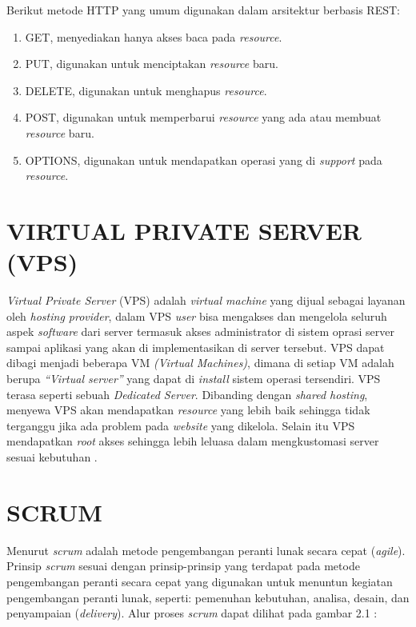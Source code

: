 \par Berikut metode HTTP yang umum digunakan dalam arsitektur berbasis REST:
\begin{enumerate}
	\item GET, menyediakan hanya akses baca pada \textit{resource}.
	\item PUT, digunakan untuk menciptakan \textit{resource} baru.
	\item DELETE, digunakan untuk menghapus \textit{resource}.
	\item POST, digunakan untuk memperbarui \textit{resource} yang ada atau membuat \textit{resource} baru.
	\item OPTIONS, digunakan untuk mendapatkan operasi yang di \textit{support} pada \textit{resource}.
\end{enumerate}

\section{\uppercase{Virtual Private Server (VPS)}}
\textit{Virtual Private Server} (VPS) adalah \textit{virtual machine} yang dijual sebagai layanan oleh \textit{hosting provider}, dalam VPS \textit{user} bisa mengakses dan mengelola seluruh aspek \textit{software} dari server termasuk akses administrator di sistem oprasi server sampai aplikasi yang akan di implementasikan di server tersebut. VPS dapat dibagi menjadi beberapa VM \textit{(Virtual Machines)}, dimana di setiap VM adalah berupa \textit{“Virtual server”} yang dapat di \textit{install} sistem operasi tersendiri. VPS terasa seperti sebuah \textit{Dedicated Server}. Dibanding dengan \textit{shared hosting}, menyewa VPS akan mendapatkan \textit{resource} yang lebih baik sehingga tidak terganggu jika ada problem pada \textit{website} yang dikelola. Selain itu VPS mendapatkan \textit{root} akses sehingga lebih leluasa dalam mengkustomasi server sesuai kebutuhan \citep{hamida2017analisis}.

\section{\uppercase{Scrum}}
Menurut \cite{pressman2010} \textit{scrum} adalah metode pengembangan peranti lunak secara cepat (\textit{agile}). Prinsip \textit{scrum} sesuai dengan prinsip-prinsip yang terdapat pada metode pengembangan peranti secara cepat yang digunakan untuk menuntun kegiatan pengembangan peranti lunak, seperti: pemenuhan kebutuhan, analisa, desain, dan penyampaian (\textit{delivery}). Alur proses \textit{scrum} dapat dilihat pada gambar 2.1 : 


